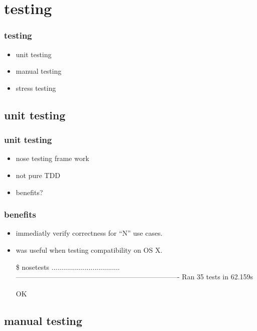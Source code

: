 
\section{testing}

\begin{frame}
  \frametitle{testing}
  \begin{itemize}
  \item unit testing
  \item manual testing
  \item stress testing
  \end{itemize}
\end{frame}


\subsection{unit testing}

\begin{frame}
  \frametitle{unit testing}
  \begin{itemize}
  \item<1-> nose testing frame work
  \item<2-> not pure TDD
  \item<3-> benefits?
  \end{itemize}
\end{frame}

\begin{frame}[fragile]
  \frametitle{benefits}
  \begin{itemize}
  \item<1-> immediatly verify correctness for ``N'' use cases.
  \item<2-> was useful when testing compatibility on OS X.
{\tiny
\begin{semiverbatim}
\$ nosetests
...................................
----------------------------------------------------------------------
Ran 35 tests in 62.159s

OK
\end{semiverbatim}
}
  \end{itemize}
\end{frame}


\subsection{manual testing}

